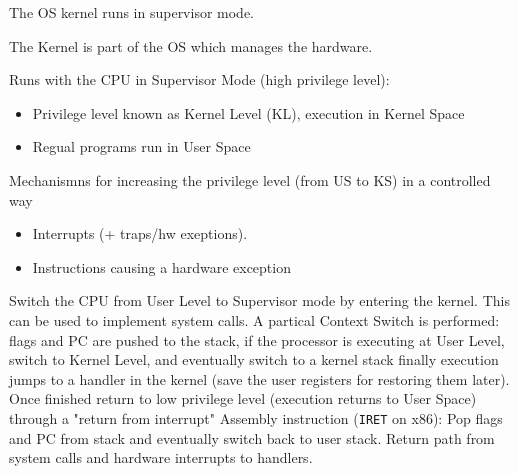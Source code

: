 The OS kernel runs in supervisor mode.


The Kernel is part of the OS which manages the hardware.

Runs with the CPU in Supervisor Mode (high privilege level):
\begin{itemize}
    \item Privilege level known as Kernel Level (KL), execution in Kernel Space
    \item Regual programs run in User Space
\end{itemize}
Mechanismns for increasing the privilege level (from US to KS) in a controlled way
\begin{itemize}
    \item Interrupts (+ traps/hw exeptions).\\
    \item Instructions causing a hardware exception
\end{itemize}
Switch the CPU from User Level to Supervisor mode by entering the kernel. This can be used to implement system calls.
A partical Context Switch is performed: flags and PC are pushed to the stack, if the processor is executing at User Level, switch to Kernel Level, and eventually switch to a kernel stack finally execution jumps to a handler in the kernel (save the user registers for restoring them later).
Once finished return to low privilege level (execution returns to User Space) through a "return from interrupt" Assembly instruction (\texttt{IRET} on x86): Pop flags and PC from stack and eventually switch back to user stack.
Return path  from system calls and hardware interrupts to handlers.

